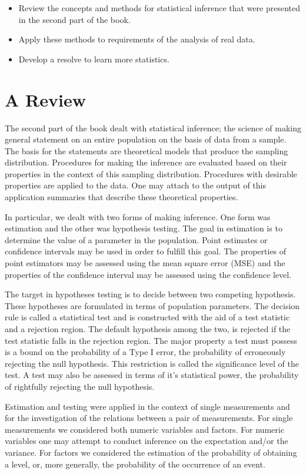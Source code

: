 \documentclass[]{krantz}
\theoremstyle{definition}
\theoremstyle{definition}
\theoremstyle{definition}
\theoremstyle{remark}
\begin{document}
\begin{itemize}
\item
  Review the concepts and methods for statistical inference that were
  presented in the second part of the book.
\item
  Apply these methods to requirements of the analysis of real data.
\item
  Develop a resolve to learn more statistics.
\end{itemize}

\section{A Review}\label{a-review}

The second part of the book dealt with statistical inference; the
science of making general statement on an entire population on the basis
of data from a sample. The basis for the statements are theoretical
models that produce the sampling distribution. Procedures for making the
inference are evaluated based on their properties in the context of this
sampling distribution. Procedures with desirable properties are applied
to the data. One may attach to the output of this application summaries
that describe these theoretical properties.

In particular, we dealt with two forms of making inference. One form was
estimation and the other was hypothesis testing. The goal in estimation
is to determine the value of a parameter in the population. Point
estimates or confidence intervals may be used in order to fulfill this
goal. The properties of point estimators may be assessed using the mean
square error (MSE) and the properties of the confidence interval may be
assessed using the confidence level.

The target in hypotheses testing is to decide between two competing
hypothesis. These hypotheses are formulated in terms of population
parameters. The decision rule is called a statistical test and is
constructed with the aid of a test statistic and a rejection region. The
default hypothesis among the two, is rejected if the test statistic
falls in the rejection region. The major property a test must possess is
a bound on the probability of a Type I error, the probability of
erroneously rejecting the null hypothesis. This restriction is called
the significance level of the test. A test may also be assessed in terms
of it's statistical power, the probability of rightfully rejecting the
null hypothesis.

Estimation and testing were applied in the context of single
measurements and for the investigation of the relations between a pair
of measurements. For single measurements we considered both numeric
variables and factors. For numeric variables one may attempt to conduct
inference on the expectation and/or the variance. For factors we
considered the estimation of the probability of obtaining a level, or,
more generally, the probability of the occurrence of an event.
\end{document}
